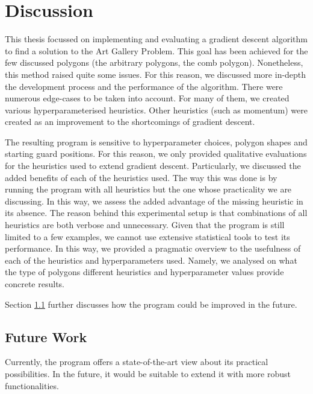 \section{Discussion}
This thesis focussed on implementing and evaluating a gradient descent algorithm to find a solution to the Art Gallery Problem. This goal has been achieved for the few discussed polygons (the arbitrary polygons, the comb polygon). 
Nonetheless, this method raised quite some issues. For this reason, we discussed more in-depth the development process and the performance of the algorithm. There were numerous edge-cases to be taken into account. For many of them, we created various hyperparameterised heuristics. Other heuristics (such as momentum) were created as an improvement to the shortcomings of gradient descent.

The resulting program is sensitive to hyperparameter choices, polygon shapes and starting guard positions. For this reason, we only provided qualitative evaluations for the heuristics used to extend gradient descent. Particularly, we discussed the added benefits of each of the heuristics used. The way this was done is by running the program with all heuristics but the one whose practicality we are discussing. In this way, we assess the added advantage of the missing heuristic in its absence. The reason behind this experimental setup is that combinations of all heuristics are both verbose and unnecessary. Given that the program is still limited to a few examples, we cannot use extensive statistical tools to test its performance.
In this way, we provided a pragmatic overview to the usefulness of each of the heuristics and hyperparameters used. Namely, we analysed on what the type of polygons different heuristics and hyperparameter values provide concrete results.

Section \ref{sec:future} further discusses how the program could be improved in the future.




\subsection{Future Work}
\label{sec:future}
Currently, the program offers a state-of-the-art view about its practical possibilities.
In the future, it would be suitable to extend it with more robust functionalities.

